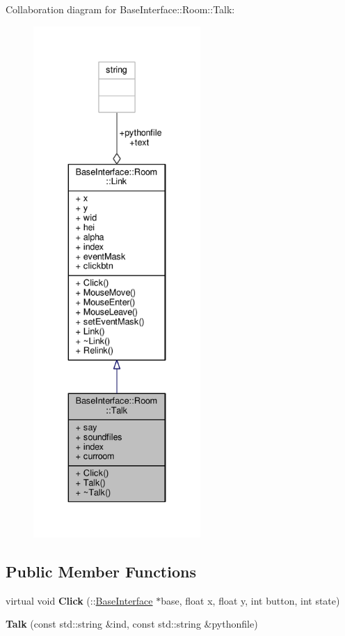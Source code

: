 Collaboration diagram for Base\+Interface\+:\+:Room\+:\+:Talk\+:
\nopagebreak
\begin{figure}[H]
\begin{center}
\leavevmode
\includegraphics[height=550pt]{d6/d0c/classBaseInterface_1_1Room_1_1Talk__coll__graph}
\end{center}
\end{figure}
\subsection*{Public Member Functions}
\begin{DoxyCompactItemize}
\item 
virtual void {\bfseries Click} (\+::\hyperlink{classBaseInterface}{Base\+Interface} $\ast$base, float x, float y, int button, int state)\hypertarget{classBaseInterface_1_1Room_1_1Talk_a99b6ab1b399d39f313ce8ab58535bbfa}{}\label{classBaseInterface_1_1Room_1_1Talk_a99b6ab1b399d39f313ce8ab58535bbfa}

\item 
{\bfseries Talk} (const std\+::string \&ind, const std\+::string \&pythonfile)\hypertarget{classBaseInterface_1_1Room_1_1Talk_a792adbe4ba948a3e5511ef50d924c852}{}\label{classBaseInterface_1_1Room_1_1Talk_a792adbe4ba948a3e5511ef50d924c852}

\end{DoxyCompactItemize}
